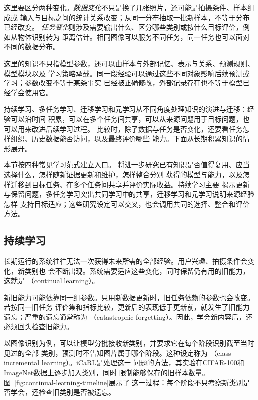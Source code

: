 这里要区分两种变化。\emph{数据变化}不只是换了几张照片，还可能是拍摄条件、样本组成或
输入与目标之间的统计关系改变；从同一分布抽取一批新样本，不等于分布已经改变。
\emph{任务变化}则涉及需要输出什么、区分哪些类别或按什么目标评价，例如从物体识别转为
距离估计。相同图像可以服务不同任务，同一任务也可以面对不同的数据分布。

这里的知识不只指模型参数，还可以由样本与外部记忆、表示与关系、预测规则、模型模块以及
学习策略承载。同一段经验可以通过这些不同对象影响后续预测或学习；参数改变不等于某条事实
已经被正确修改，外部记录存在也不等于模型已经学会使用它。

持续学习、多任务学习、迁移学习和元学习从不同角度处理知识的演进与迁移：经验可以沿时间
积累，可以在多个任务间共享，可以从来源问题用于目标问题，也可以用来改进后续学习过程。
比较时，除了数据与任务是否变化，还要看任务怎样组织、历史数据能否访问，以及最终评价哪些
能力。下面从长期积累知识的情形展开。

本节按四种常见学习范式建立入口。
将进一步研究已有知识是否值得复用、应当选择什么，怎样随新证据更新和维护，怎样整合分别
获得的模型与能力，以及怎样迁移到目标任务、在多个任务间共享并评价实际收益。持续学习主要
揭示更新与保留问题，多任务学习突出共同学习中的共享，迁移学习和元学习说明来源经验怎样
支持目标适应；这些研究设定可以交叉，也会调用共同的选择、整合和评价方法。

\subsection{持续学习}
\label{sec:continual-learning}

长期运行的系统往往无法一次获得未来所需的全部经验。用户兴趣、拍摄条件会变化，新类别也
会不断出现。系统需要适应这些变化，同时保留仍有用的旧能力，这就是
（continual learning）。

新旧能力可能依靠同一组参数。只用新数据更新时，旧任务依赖的参数也会改变。若按同一旧任务
评价集和指标比较，更新后的表现低于更新前，就发生了旧能力遗忘；严重的遗忘通常称为
（catastrophic forgetting）。因此，学会新内容后，还必须回头检查旧能力。

以图像识别为例，可以让模型分批接收新类别，并要求它在每个阶段识别截至当时见过的全部
类别，预测时不告知图片属于哪个阶段。这种设定称为
（class-incremental learning）。iCaRL是处理这一
问题的方法，其实验在CIFAR-100和ImageNet数据上逐步加入类别，同时
限制能够保存的旧样本数量。图~\ref{fig:continual-learning-timeline}展示了
这一过程：每个阶段不只考察新类别是否学会，还检查旧类别是否被遗忘。

